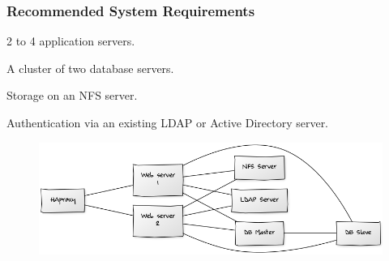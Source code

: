 \documentclass[letterpaper,10pt,english]{sphinxmanual}
\begin{document}
\subsubsection{Recommended System Requirements}
\label{installation/deployment_recommendations:id1}
2 to 4 application servers.

A cluster of two database servers.

Storage on an NFS server.

Authentication via an existing LDAP or Active Directory server.
\begin{figure}[htbp]
\centering

\includegraphics{deprecs-2.png}
\end{figure}
\end{document}
